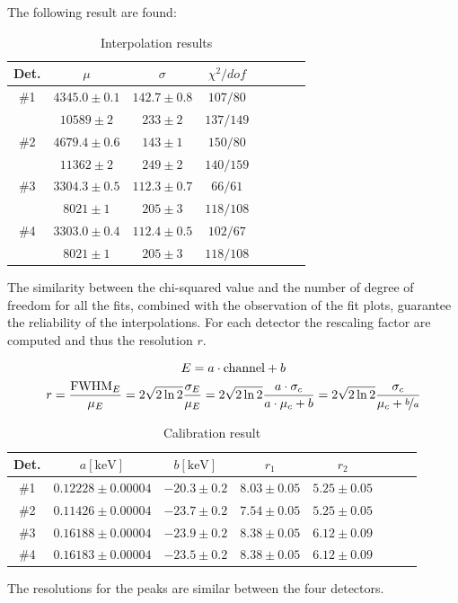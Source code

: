 \documentclass[11pt,a4 paper]{article}
\let\oldfrac\frac
\renewcommand{\frac}[3][d]{\ifthenelse{\equal{#1}{d}}{\oldfrac{#2}{#3}}{\nicefrac{#2}{#3}}}
\begin{document}
The following result are found:
\begin{table}[H]
    \centering
    \begin{tabular}{cccccccc}
        \toprule
        Det. & $\mu$ & $\sigma$ & $\chi^2/dof$ \\
        \midrule
        \#1 & $4345.0 \pm 0.1$ & $142.7 \pm 0.8$ & $107/80$ \\
        & $10589 \pm 2$ & $233 \pm 2$ & $137/149$ \\
        \#2 & $4679.4 \pm 0.6$ & $143 \pm 1$ & $150/80$ \\
        & $11362 \pm 2$ & $249 \pm 2$ & $140/159$ \\
        \#3 & $3304.3\pm0.5$ & $112.3\pm 0.7$ & $66/61$ \\
        & $8021\pm 1$ & $205\pm3$ & $118/108$ \\
        \#4 & $3303.0\pm0.4$ & $112.4\pm0.5$ & $102/67$ \\
        & $8021\pm1$ & $205\pm3$ & $118/108$\\
        \bottomrule
    \end{tabular}
    \caption{Interpolation results}
    \label{tab:calibr1}
\end{table}

The similarity between the chi-squared value and the number of degree of freedom for all the fits, combined with the observation of the fit plots, guarantee the reliability of the interpolations. For each detector the rescaling factor are computed and thus the resolution $r$.

\begin{gather*}
    E = a \cdot \text{channel} + b \\
    r = \frac{\text{FWHM}_E}{\mu_E} = 2\sqrt{2\ln2} \frac{\sigma_E}{\mu_E} = 2\sqrt{2\ln2} \frac{a \cdot \sigma_c}{a \cdot \mu_c + b} = 2\sqrt{2\ln2} \frac{\sigma_c}{\mu_c + \frac[f]{b}{a}}
\end{gather*}

\begin{table}[H]
    \centering
    \begin{tabular}{cccccccc}
        \toprule
        Det. & $a [\si{\kilo\electronvolt}]$ & $b [\si{\kilo\electronvolt}]$ & $r_1$ & $r_2$ \\
        \midrule
        \#1 & $0.12228\pm0.00004$ & $-20.3\pm0.2$ & $8.03\pm0.05$ & $5.25\pm0.05$ \\
        \#2 & $0.11426\pm0.00004$ & $-23.7\pm0.2$ & $7.54\pm0.05$ & $5.25\pm0.05$ \\
        \#3 & $0.16188\pm0.00004$ & $-23.9\pm0.2$ & $8.38\pm0.05$ & $6.12\pm0.09$ \\
        \#4 & $0.16183\pm0.00004$ & $-23.5\pm0.2$ & $8.38\pm0.05$ & $6.12\pm0.09$ \\
        \bottomrule
    \end{tabular}
    \caption{Calibration result}
    \label{tab:calib2}
\end{table}
The resolutions for the peaks are similar between the four detectors.
\end{document}
